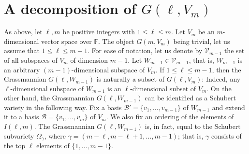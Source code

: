 \documentclass[10pt,a4paper,oneside]{amsproc}
\newcommand{\B}{\mathcal{B}}
\def\FF{{\mathbb F}}
\def\PP{{\mathbb P}}
\newcommand{\V}{{\mathcal{V}}}
\begin{document}

  
\section{A decomposition of $G(\ell, V_{m})$} \label{dec}
As above, let $\ell, m$ be positive integers with $1 \le \ell \le m$. Let $V_m$ be an $m$-dimensional vector space over $\FF$. The object $G(m, V_m)$ being trivial, let us assume that $1 \le \ell \le m-1$. For ease of notation, let us denote by $\V_{m-1}$ the set of all subspaces of $V_m$ of dimension $m-1$.  
Let $W_{m-1} \in \V_{m-1}$, that is, $W_{m-1}$ is an arbitrary $(m-1)$-dimensional subspace of $V_m$. If $1 \le \ell \le m-1$, then the Grassmannian $G(\ell, W_{m-1})$ is naturally a subset of $G(\ell, V_m)$: Indeed, any $\ell$-dimensional subspace of $W_{m-1}$ is an $\ell$-dimensional subset of $V_m$. On the other hand, the Grassmannian $G(\ell, W_{m-1})$ can be identified as a Schubert variety in the following way. Fix a basis $\B' = \{v_1, \dots, v_{m-1} \}$ of $W_{m-1}$ and extend it to a basis $\B = \{v_1, \dots, v_m\}$ of $V_m$. We also fix an ordering of the elements of $I(\ell, m)$. The Grassmannian $G(\ell, W_{m-1})$ is, in fact, equal to the Schubert subvariety $\Omega_{\gamma}$, where $\gamma = (m- \ell, m - \ell+1,  \dots, m-1)$; that is, $\gamma$ consists of the top $\ell$ elements of $\{1, \dots, m-1\}$. 
\end{document}
